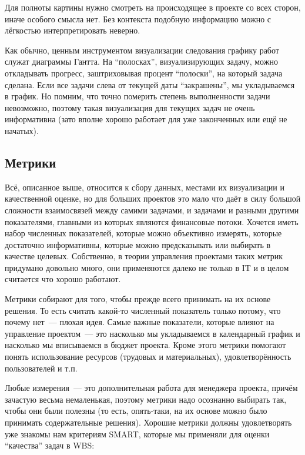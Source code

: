 \documentclass{../../text-style}
\begin{document}
Для полноты картины нужно смотреть на происходящее в проекте со всех сторон, иначе особого смысла нет. Без контекста подобную информацию можно с лёгкостью интерпретировать неверно.

Как обычно, ценным инструментом визуализации следования графику работ служат диаграммы Гантта. На \enquote{полосках}, визуализирующих задачу, можно откладывать прогресс, заштриховывая процент \enquote{полоски}, на который задача сделана. Если все задачи слева от текущей даты \enquote{закрашены}, мы укладываемся в график. Но помним, что точно померить степень выполненности задачи невозможно, поэтому такая визуализация для текущих задач не очень информативна (зато вполне хорошо работает для уже законченных или ещё не начатых).

\subsection{Метрики}

Всё, описанное выше, относится к сбору данных, местами их визуализации и качественной оценке, но для больших проектов это мало что даёт в силу большой сложности взаимосвязей между самими задачами, и задачами и разными другими показателями, главными из которых являются финансовые потоки. Хочется иметь набор численных показателей, которые можно объективно измерять, которые достаточно информативны, которые можно предсказывать или выбирать в качестве целевых. Собственно, в теории управления проектами таких метрик придумано довольно много, они применяются далеко не только в IT и в целом считается что хорошо работают.

Метрики собирают для того, чтобы прежде всего принимать на их основе решения. То есть считать какой-то численный показатель только потому, что почему нет~--- плохая идея. Самые важные показатели, которые влияют на управление проектом~--- это насколько мы укладываемся в календарный график и насколько мы вписываемся в бюджет проекта. Кроме этого метрики помогают понять использование ресурсов (трудовых и материальных), удовлетворённость пользователей и т.п.

Любые измерения~--- это дополнительная работа для менеджера проекта, причём зачастую весьма немаленькая, поэтому метрики надо осознанно выбирать так, чтобы они были полезны (то есть, опять-таки, на их основе можно было принимать содержательные решения). Хорошие метрики должны удовлетворять уже знакомы нам критериям SMART, которые мы применяли для оценки \enquote{качества} задач в WBS:
\end{document}

